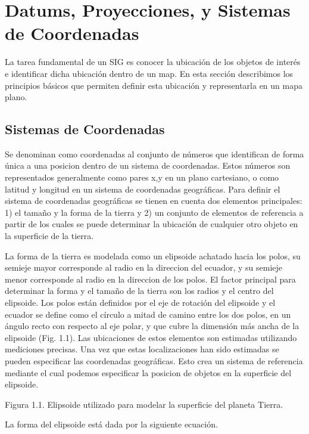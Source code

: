 \documentclass[final,fmstyle]{fpunathesis}
\begin{document}
\section{Datums, Proyecciones, y Sistemas de Coordenadas}

La tarea fundamental de un SIG es conocer la ubicación de los objetos de interés e identificar dicha ubicación dentro de un map. En esta sección describimos los principios básicos que permiten definir esta ubicación y representarla en un mapa plano.

\subsection{Sistemas de Coordenadas}

Se denominan como coordenadas al conjunto de números que identifican de forma única a una posicion dentro de un sistema de coordenadas. Estos números son representados generalmente como pares x,y en un plano cartesiano, o como latitud y longitud en un sistema de coordenadas geográficas. Para definir el sistema de coordenadas geográficas se tienen en cuenta dos elementos principales: 1) el tamaño y la forma de la tierra y 2) un conjunto de elementos de referencia a partir de los cuales se puede determinar la ubicación de cualquier otro objeto en la superficie de la tierra.

La forma de la tierra es modelada como un elipsoide achatado hacia los polos, su semieje mayor corresponde al radio en la direccion del ecuador, y su semieje menor corresponde al radio en la direccion de los polos. El factor principal para determinar la forma y el tamaño de la tierra son los  radios y el centro del elipsoide. Los polos están definidos por el eje de rotación del elipsoide y el ecuador se define como el círculo a mitad de camino entre los dos polos, en un ángulo recto con respecto al eje polar, y que cubre la dimensión más ancha de la elipsoide (Fig. 1.1). Las ubicaciones de estos elementos son estimadas utilizando mediciones  precisas. Una vez que estas localizaciones han sido estimadas se pueden especificar las coordenadas geográficas. Esto crea un sistema de referencia mediante el cual podemos especificar la posicion de objetos en la superficie del elipsoide.

Figura 1.1. Elipsoide utilizado para modelar la superficie del planeta Tierra.

La forma del elipsoide está dada por la siguiente ecuación.
\end{document}
